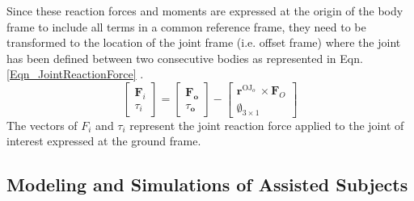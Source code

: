\documentclass[10pt,letterpaper]{article}
\begin{document}
Since these reaction forces and moments are expressed at the origin of the body frame to include all terms in a common reference frame, they need to be transformed to the location of the joint frame (i.e. offset frame) where the joint has been defined between two consecutive bodies as represented in Eqn. \eqref{Eqn_JointReactionForce} \cite{151}.
\begin{equation}\label{Eqn_JointReactionForce}
\left\lbrack \begin{array}{c}
{\mathit{\mathbf{F}}}_i \\
\tau_i 
\end{array}\right\rbrack =\left\lbrack \begin{array}{c}
{\mathit{\mathbf{F}}}_{\mathit{\mathbf{o}}} \\
\tau_{\mathit{\mathbf{o}}} 
\end{array}\right\rbrack -\left\lbrack \begin{array}{c}
{\mathit{\mathbf{r}}}^{{\mathrm{OJ}}_o \;} \times {\mathit{\mathbf{F}}}_O \\
\emptyset_{3\times 1} 
\end{array}\right\rbrack
\end{equation}
The vectors of $F_i$ and $\tau_i$ represent the joint reaction force applied to the joint of interest expressed at the ground frame.\\
\subsection*{Modeling and Simulations of Assisted Subjects}
\end{document}
